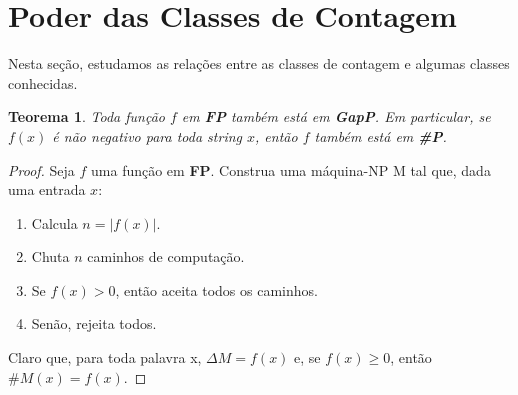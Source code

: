 \documentclass[paper=a4, fontsize=11pt]{scrartcl} %
\newtheorem{theorem}{Teorema}
\numberwithin{equation}{subsection}
\numberwithin{figure}{subsection}
\numberwithin{table}{subsection}
\numberwithin{definition}{subsection}
\numberwithin{theorem}{subsection}
\numberwithin{property}{subsection}
\numberwithin{proposition}{subsection}
\newcommand{\SP}{\textbf{\#P}\xspace}
\newcommand{\FP}{\textbf{FP}\xspace}
\newcommand{\gP}{\textbf{GapP}\xspace}
\newcommand{\npmach}{máquina-NP\xspace}
\newcommand{\del}[1]{\Delta #1}
\begin{document}
\pagebreak
\section{Poder das Classes de Contagem}

Nesta seção, estudamos as relações entre as classes de contagem e algumas classes conhecidas. 

\begin{theorem} Toda função $f$ em \FP também está em \gP. Em particular, se $f(x)$ é não negativo para toda string $x$, então $f$ também está em \SP.
\end{theorem}
\begin{proof}
Seja $f$ uma função em \FP. Construa uma \npmach M tal que, dada uma entrada $x$:
\begin{enumerate}
  \item Calcula $n = |f(x)|$.
  \item Chuta $n$ caminhos de computação.
  \item Se $f(x) > 0$, então aceita todos os caminhos.
  \item Senão, rejeita todos.
\end{enumerate}

Claro que, para toda palavra x, $\del M = f(x)$ e, se $f(x) \geq 0$, então $\# M(x) = f(x)$.
\end{proof}
\end{document}
